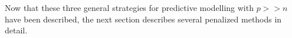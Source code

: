
Now that these three general strategies for predictive modelling with $p>>n$ have been described, the next section describes several penalized methods in detail.

\begin{comment}
\ctable[caption={Summary of methods used in simulation study},label=tab:methods,pos=h!,doinside=\footnotesize]{LLLLL}{
}{
\FL
General Approach              & Summary Measure of Feature Clusters & Regression Model & Description \ML
Univariate (uni) & NA  & linear model & \multicolumn{1}{m{5cm}}{Fit a joint model on top 5\% most marginally associated predictors}\\
\addlinespace[5pt] 
Penalization (pen)  & NA & ridge, lasso, scad, elasticnet, mcp & \multicolumn{1}{m{5cm}}{no grouping information is used} \\
\addlinespace[5pt] 
Group Penalization (group)  & NA & group lasso & \multicolumn{1}{m{5cm}}{groups are pre-determined via hierarchical clustering on gene expression correlation matrix}\\
\addlinespace[5pt] 
Cluster (clust) & principal component, average, sparse principal component & linear model, lasso, elasticnet & \multicolumn{1}{m{5cm}}{fit model using summary measure of hierarchical clusters as predictors. clusters are automatically chosen using the \texttt{dynamicTreeCut}~\cite{langfelder2008defining} algorithm} \\
\addlinespace[5pt] 
Environment Cluster (Eclust) & principal component, average, sparse principal component & linear model, lasso, elasticnet & \multicolumn{1}{m{5cm}}{use environment to inform the clustering, then fit model on summary measures of the derived clusters. clusters are chosen using \texttt{kmeans} with $K=2$} \\
\LL
}
\end{comment}




